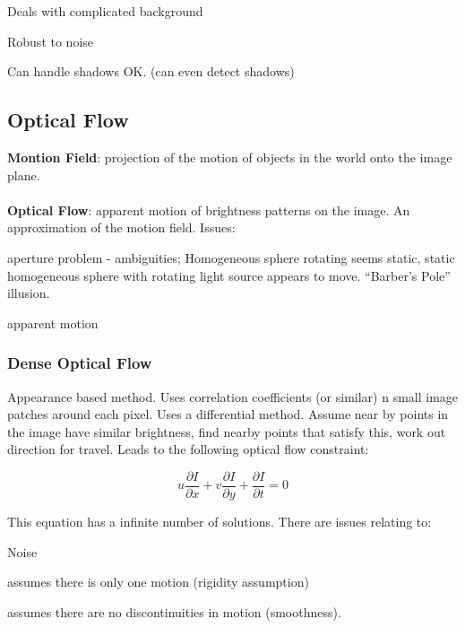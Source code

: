 \documentclass[8pt]{extarticle}
\begin{document}
\begin{multicols}{2}
\begin{compactitem}
    \item Deals with complicated background
    \item Robust to noise
    \item Can handle shadows OK. (can even detect shadows)
\end{compactitem}

\subsection{Optical Flow}
\textbf{Montion Field}: projection of the motion of objects in the world onto the image plane. \\ \\
\textbf{Optical Flow}: apparent motion of brightness patterns on the image. An approximation of the motion field. Issues:
\begin{compactitem}
    \item aperture problem - ambiguities; Homogeneous sphere rotating seems static, static homogeneous sphere with rotating light source appears to move. ``Barber's Pole'' illusion.
    \item apparent motion
\end{compactitem}

\subsubsection{Dense Optical Flow}
Appearance based method. Uses correlation coefficients (or similar) n small image patches around each pixel. Uses a differential method. Assume near by points in the image have similar brightness, find nearby points that satisfy this, work out direction for travel. Leads to the following optical flow constraint:

\begin{equation}
    u\frac{\partial I}{\partial x} + v\frac{\partial I}{\partial y} + \frac{\partial I}{\partial t} = 0
\end{equation}

This equation has a infinite number of solutions. There are issues relating to:
\begin{compactitem}
    \item Noise
    \item assumes there is only one motion (rigidity assumption)
    \item assumes there are no discontinuities in motion (smoothness).
\end{compactitem}


\end{multicols}
\end{document}
